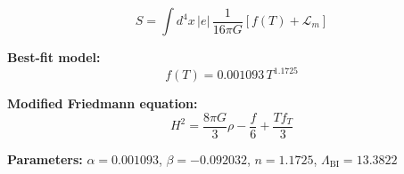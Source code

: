 
\begin{equation}
  S = \int d^4x \, |e| \, \frac{1}{16\pi G} \left[ f(T) + \mathcal{L}_m \right]
\end{equation}

\textbf{Best-fit model:}
\begin{equation}
  f(T) = 0.001093 \, T^{1.1725}
\end{equation}

\textbf{Modified Friedmann equation:}
\begin{equation}
  H^2 = \frac{8\pi G}{3} \rho - \frac{f}{6} + \frac{T f_T}{3}
\end{equation}

\textbf{Parameters:}
$\alpha = 0.001093$, \quad
$\beta = -0.092032$, \quad
$n = 1.1725$, \quad
$\Lambda_{\text{BI}} = 13.3822$